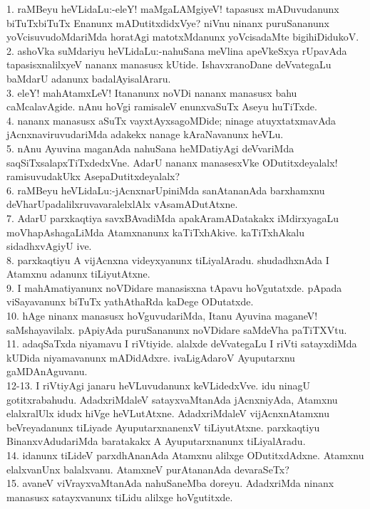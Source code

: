 \documentclass{article}
\begin{document}
1. raMBeyu heVLidaLu:-eleY! maMgaLAMgiyeV! tapasusx mADuvudanunx biTuTxbiTuTx  Enanunx mADutitxdidxVye? niVnu ninanx puruSananunx yoVcisuvudoMdariMda horatAgi matotxMdanunx yoVcisadaMte bigihiDidukoV.\\
2. ashoVka suMdariyu heVLidaLu:-nahuSana meVlina apeVkeSxya rUpavAda tapasisxnalilxyeV nananx manasusx kUtide. IshavxranoDane deVvategaLu baMdarU adanunx badalAyisalAraru.\\
3. eleY! mahAtamxLeV! Itananunx noVDi nananx manasusx bahu caMcalavAgide. nAnu hoVgi ramisaleV enunxvaSuTx Aseyu huTiTxde.\\
4. nananx manasusx aSuTx vayxtAyxsagoMDide; ninage atuyxtatxmavAda jAcnxnaviruvudariMda adakekx nanage kAraNavanunx heVLu.\\
5. nAnu Ayuvina maganAda nahuSana heMDatiyAgi deVvariMda saqSiTxsalapxTiTxdedxVne. AdarU nananx manasesxVke ODutitxdeyalalx! ramisuvudakUkx AsepaDutitxdeyalalx?\\
6. raMBeyu heVLidaLu:-jAcnxnarUpiniMda sanAtananAda barxhamxnu deVharUpadalilxruvavaralelxlAlx vAsamADutAtxne.\\
7. AdarU parxkaqtiya savxBAvadiMda apakAramADatakakx iMdirxyagaLu moVhapAshagaLiMda Atamxnanunx kaTiTxhAkive. kaTiTxhAkalu sidadhxvAgiyU ive.\\
8. parxkaqtiyu A vijAcnxna videyxyanunx tiLiyalAradu. shudadhxnAda I Atamxnu adanunx tiLiyutAtxne.\\
9. I mahAmatiyanunx noVDidare manasisxna tApavu hoVgutatxde. pApada viSayavanunx biTuTx yathAthaRda kaDege ODutatxde.\\
10. hAge ninanx manasusx hoVguvudariMda, Itanu Ayuvina maganeV! saMshayavilalx. pApiyAda puruSananunx noVDidare saMdeVha paTiTXVtu.\\
11. adaqSaTxda niyamavu I riVtiyide. alalxde deVvategaLu I riVti satayxdiMda kUDida niyamavanunx mADidAdxre. ivaLigAdaroV Ayuputarxnu gaMDAnAguvanu.\\
12-13. I riVtiyAgi janaru heVLuvudanunx keVLidedxVve. idu ninagU gotitxrabahudu. AdadxriMdaleV satayxvaMtanAda jAcnxniyAda, Atamxnu elalxralUlx idudx hiVge heVLutAtxne. AdadxriMdaleV vijAcnxnAtamxnu beVreyadanunx tiLiyade AyuputarxnanenxV tiLiyutAtxne. parxkaqtiyu BinanxvAdudariMda baratakakx A Ayuputarxnanunx tiLiyalAradu.\\
14. idanunx tiLideV parxdhAnanAda Atamxnu alilxge ODutitxdAdxne. Atamxnu elalxvanUnx balalxvanu. AtamxneV purAtananAda devaraSeTx?\\
15. avaneV viVrayxvaMtanAda nahuSaneMba doreyu. AdadxriMda ninanx manasusx satayxvanunx tiLidu alilxge hoVgutitxde.\\
\end{document}
